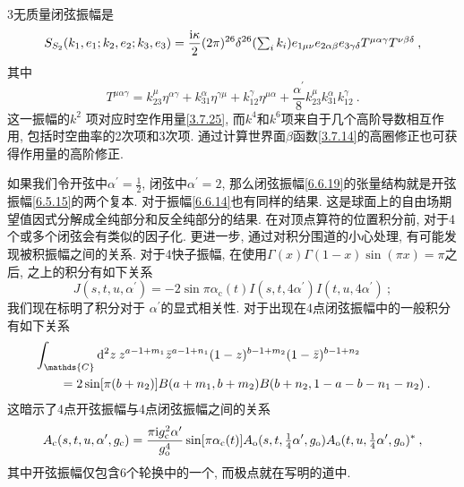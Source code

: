 3无质量闭弦振幅是
\begin{equation}
	S_{S_{2}}(k_{1}, e_{1} ; k_{2}, e_{2} ; k_{3}, e_{3})=\frac{\mathrm{i} \kappa}{2}(2 \pi)^{26} 
	\delta^{26}(\textstyle{\sum_{i} k_{i}}) e_{1 \mu \nu} e_{2 \alpha \beta} e_{3 \gamma \delta} T^{\mu \alpha \gamma} T^{\nu \beta \delta} \:, \label{6.6.19}
\end{equation}
其中
\begin{equation}
	T^{\mu \alpha \gamma}=k_{23}^{\mu} \eta^{\alpha \gamma}+k_{31}^{\alpha} \eta^{\gamma \mu}+k_{12}^{\gamma} \eta^{\mu \alpha}+\frac{\alpha^{\prime}}{8} k_{23}^{\mu} k_{31}^{\alpha} k_{12}^{\gamma} \:. \label{6.6.20}
\end{equation}
这一振幅的$k^{2}$ 项对应时空作用量\eqref{3.7.25}, 而$k^{4}$和$k^{6}$项来自于几个高阶导数相互作用, 包括时空曲率的2次项和3次项. 
通过计算世界面$\beta$函数\eqref{3.7.14}的高圈修正也可获得作用量的高阶修正.

如果我们令开弦中$\alpha^{\prime}=\frac{1}{2}$, 闭弦中$\alpha^{\prime}=2$, 那么闭弦振幅\eqref{6.6.19}的张量结构就是开弦振幅\eqref{6.5.15}的两个复本. 
对于振幅\eqref{6.6.14}也有同样的结果. 这是球面上的自由场期望值因式分解成全纯部分和反全纯部分的结果. 在对顶点算符的位置积分前, 对于4个或多个闭弦会有类似的因子化. 
更进一步, 通过对积分围道的小心处理, 有可能发现被积振幅之间的关系. 对于4快子振幅, 在使用$\Gamma(x) \Gamma(1-x) \sin (\pi x)=\pi $之后, 
之上的积分有如下关系
\begin{equation}
	J(s, t, u, \alpha^{\prime})=-2 \sin \pi \alpha_{\mathrm{c}}(t) I(s, t, 4 \alpha^{\prime}) I(t, u, 4 \alpha^{\prime}) \:;
	\label{6.6.21}
\end{equation}
我们现在标明了积分对于 $\alpha^{\prime} $的显式相关性. 对于出现在4点闭弦振幅中的一般积分有如下关系
\begin{align}
	&\int_{\mathds{C}} \dif^{2} z\: z^{a-1+m_{1}} \bar{z}^{a-1+n_{1}}(1-z)^{b-1+m_{2}}(1-\bar{z})^{b-1+n_{2}} \nonumber \\
	&\qquad =2 \sin [\pi(b+n_{2})] B(a+m_{1}, b+m_{2}) B(b+n_{2}, 1-a-b-n_{1}-n_{2}) \:. \label{6.6.22}
\end{align}
这暗示了4点开弦振幅与4点闭弦振幅之间的关系
\begin{equation}
	A_{\mathrm{c}}(s, t, u, \alpha^{\prime}, g_{\mathrm{c}}) = 
	\frac{\pi \mathrm{i} g_{\mathrm{c}}^{2} \alpha^{\prime}}{g_{\mathrm{o}}^{4}} 
	\sin [\pi \alpha_{\mathrm{c}}(t)] A_{\mathrm{o}}(s, t, \tfrac{1}{4} \alpha^{\prime}, g_{\mathrm{o}}) 
	A_{\mathrm{o}}(t, u, \tfrac{1}{4} \alpha^{\prime}, g_{\mathrm{o}})^{*} \:, \label{6.6.23}
\end{equation}
其中开弦振幅仅包含6个轮换中的一个, 而极点就在写明的道中.

